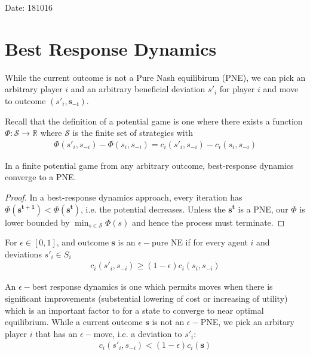 \begin{flushright}
Date: 181016
\end{flushright}

\section{Best Response Dynamics}
While the current outcome is not a Pure Nash equilibirum (PNE), we can pick an arbitrary player $i$ and an arbitrary beneficial deviation $s'_i$ for player $i$ and move to outcome $(s'_i,\mathbf{s_{-i}})$.

Recall that the definition of a potential game is one where there exists a function $\Phi:\mathcal{S}\to \mathbb{R}$ where $\mathcal{S}$ is the finite set of strategies with
\begin{align*}
\Phi(s'_i,s_{-i})-\Phi(s_i,s_{-i})=c_i(s'_i,s_{-i})-c_i(s_i,s_{-i})
\end{align*}

\begin{prop}
In a finite potential game from any arbitrary outcome, best-response dynamics converge to a PNE.
\begin{proof}
In a best-response dynamics approach, every iteration has $\Phi(\mathbf{s^{t+1}})<\Phi(\mathbf{s^t})$, i.e. the potential decreases. Unless the $\mathbf{s^t}$ is a PNE, our $\Phi$ is lower bounded by $\min_{s\in \mathcal{S}}\Phi(s)$ and hence the process must terminate.
\end{proof}
\end{prop}

\begin{defn}
For $\epsilon \in [0,1]$, and outcome $\mathbf{s}$ is an $\epsilon-$pure NE if for every agent $i$ and deviations $s'_i\in S_i$
\begin{align*}
c_i(s'_i,s_{-i})\geq (1-\epsilon)c_i(s_i,s_{-i})
\end{align*}
\end{defn}

An $\epsilon-$best response dynamics is one which permits moves when there is significant improvements (substential lowering of cost or increasing of utility) which is an important factor to for a state to converge to near optimal equilibrium. While a current outcome $\mathbf{s}$ is not an $\epsilon-$PNE, we pick an arbitary player $i$ that has an $\epsilon-$move, i.e. a deviation to $s'_i$:
\begin{align*}
c_i(s'_i,s_{-i})<(1-\epsilon)c_i(\mathbf{s})
\end{align*}


